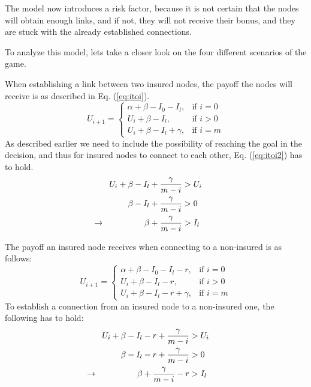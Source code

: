  The model now introduces a risk factor, because it is not certain that the nodes will obtain enough links, and if not, they will not receive their bonus, and they are stuck with the already established connections. 

To analyze this model, lets take a closer look on the four different scenarios of the game.

When establishing a link between two insured nodes, the payoff the nodes will receive is as described in Eq. (\ref{eq:itoi}).
\begin{equation}
    U_{i+1}= 
\begin{cases}
    \alpha + \beta - I_{0} - I_{l},& \text{if } i = 0\\
    U_{i}+\beta -I_{l},& \text{if }  i>0\\
    U_{i}+\beta -I_{l}+\gamma,& \text{if } i=m
    
\end{cases}
\label{eq:itoi}
\end{equation}
As described earlier we need to include the possibility of reaching the goal in the decision, and thus for insured nodes to connect to each other, Eq. (\ref{eq:itoi2}) has to hold.
\begin{eqnarray}
U_{i}+\beta-I_{l}+\frac{\gamma}{m-i}&>U_{i} \nonumber \\ 
\beta-I_{l}+\frac{\gamma}{m-i}&>0 \nonumber \\ 
\llap{$\rightarrow$\hspace{50pt}} \beta+\frac{\gamma}{m-i}&>I_{l} 
\label{eq:itoi2}
\end{eqnarray}

The payoff an insured node receives when connecting to a non-insured is as follows:
\begin{equation}
    U_{i+1}= 
\begin{cases}
    \alpha + \beta - I_{0} - I_{l} -r,& \text{if } i = 0\\
    U_{i}+\beta -I_{l}-r,& \text{if }  i>0\\
    U_{i}+\beta -I_{l}-r+\gamma,& \text{if } i=m
\end{cases}
\label{eq:itonoti}
\end{equation}
To establish a connection from an insured node to a non-insured one, the following has to hold:
\begin{eqnarray}
U_{i}+\beta-I_{l}-r+\frac{\gamma}{m-i}&>U_{i} \nonumber \\ 
\beta-I_{l}-r+\frac{\gamma}{m-i}&>0 \nonumber \\ 
\llap{$\rightarrow$\hspace{50pt}} \beta+\frac{\gamma}{m-i}-r&>I_{l} 
\end{eqnarray}

